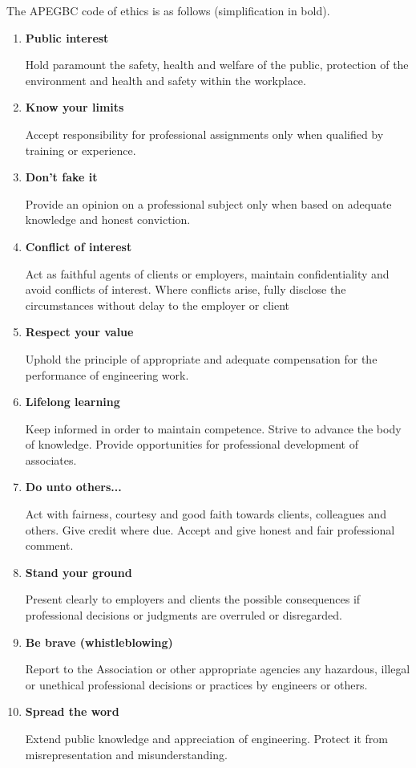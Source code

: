 \documentclass{article}
\begin{document}
The APEGBC code of ethics is as follows (simplification in bold).

\begin{enumerate}
\item \textbf{Public interest}

Hold paramount the safety, health and welfare of the
public, protection of the environment and health and
safety within the workplace. 
\item \textbf{Know your limits}

Accept responsibility for professional assignments only
when qualified by training or experience.
\item \textbf{Don't fake it}

Provide an opinion on a professional subject only when
based on adequate knowledge and honest conviction.

\item \textbf{Conflict of interest
}

Act as faithful agents of clients or employers, maintain
confidentiality and avoid conflicts of interest. Where
conflicts arise, fully disclose the circumstances without
delay to the employer or client

\item \textbf{Respect your value}

Uphold the principle of appropriate and adequate
compensation for the performance of engineering work.

\item \textbf{Lifelong learning}

 Keep informed in order to maintain competence. Strive to advance the body of knowledge. Provide opportunities
for professional development of associates.

\item \textbf{Do unto others...}

Act with fairness, courtesy and good faith towards
clients, colleagues and others. Give credit where due.
Accept and give honest and fair professional comment.

\item \textbf{Stand your ground}

Present clearly to employers and clients the possible
consequences if professional decisions or judgments are
overruled or disregarded.

\item \textbf{Be brave (whistleblowing)}

 Report to the Association or other appropriate agencies
any hazardous, illegal or unethical professional decisions
or practices by engineers or others.

\item \textbf{Spread the word}

 Extend public knowledge and appreciation of
engineering. Protect it from misrepresentation and
misunderstanding.

\end{enumerate}
\end{document}
